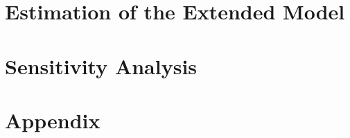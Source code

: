 \documentclass[12pt,a4paper,leqno]{article}
\begin{document}
\section{Estimation of the Extended Model}
\label{sec:estimation_extended_model}

\section{Sensitivity Analysis}
\label{sec:sensitivity}

\newpage
\vfill
{}




\newpage
\section*{Appendix}

\end{document}
